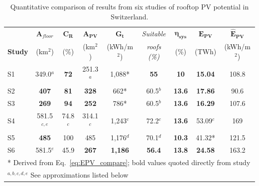 \begin{table}[tb]
\centering
\footnotesize
\caption{Quantitative comparison of results from six studies of rooftop PV potential in Switzerland.}
\label{tab:compare_values}
\begin{tabular}{lcccccccc}
\hline
     & $\boldsymbol{A_{\mathit{floor}}}$       & $\boldsymbol{C_R}$          & $\boldsymbol{A_{PV}}$          & $\boldsymbol{G_t}$             & \textit{Suitable}   & $\boldsymbol{\eta_{sys}}$          & $\boldsymbol{E_{PV}}$            & $\boldsymbol{\hat{E}_{PV}}$       \\
\textbf{Study} & (km$^2$)        & (\%)        & (km$^2$)        & (kWh/m$^2$)       & \textit{roofs (\%)} & (\%)          & (TWh)          & (kWh/m$^2$) \\ \hline
S1             & 349.0$^a$   & \textbf{72} & 251.3$^a$       & 1,088*         & \textbf{55}         & \textbf{10}   & \textbf{15.04} & 108.8    \\
S2             & \textbf{407} & \textbf{81} & \textbf{328} & 662*           & 60.5$^b$               & \textbf{13.6} & \textbf{17.86} & 90.6     \\
S3             & \textbf{269} & \textbf{94} & \textbf{252} & 786*           & 60.5$^b$               & \textbf{13.6} & \textbf{16.29} & 107.6    \\
S4             & 581.5$^{c,e}$       & 74.8$^c$       & 314.1$^c$       & 1,243$^c$         & 72.2$^c$               & \textbf{13.6} & 53.09$^c$         & 169      \\
S5             & \textbf{485} & 100         & 485          & 1,176$^d$         & 70.1$^d$               & \textbf{10.3} & 41.32*         & 121.5    \\
S6             & 581.5$^e$       & 45.9        & \textbf{267} & \textbf{1,186} & \textbf{56.4}       & \textbf{13.8} & \textbf{24.58} & 163.2    \\ \hline
\multicolumn{9}{l}{* Derived from Eq.~\ref{eq:EPV_compare}; bold values quoted directly from study}   \\ 
\multicolumn{9}{l}{$^{a,b,c,d,e}$ See approximations listed below}
\end{tabular}

\end{table}

